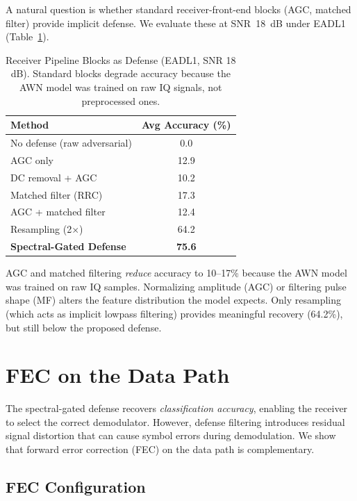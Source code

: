 \documentclass[letterpaper,twocolumn,10pt]{article}
\begin{document}
A natural question is whether standard receiver-front-end blocks
(AGC, matched filter) provide implicit defense. We evaluate these
at SNR~18~dB under EADL1 (Table~\ref{tab:rxpipe}).

\begin{table}[t]
\caption{Receiver Pipeline Blocks as Defense (EADL1, SNR 18 dB).
  Standard blocks degrade accuracy because the AWN model was trained
  on raw IQ signals, not preprocessed ones.}
\label{tab:rxpipe}
\centering
\small
\begin{tabular}{lc}
\toprule
Method & Avg Accuracy (\%) \\
\midrule
No defense (raw adversarial) & 0.0 \\
AGC only & 12.9 \\
DC removal + AGC & 10.2 \\
Matched filter (RRC) & 17.3 \\
AGC + matched filter & 12.4 \\
Resampling (2$\times$) & 64.2 \\
\midrule
\textbf{Spectral-Gated Defense} & \textbf{75.6} \\
\bottomrule
\end{tabular}
\end{table}

AGC and matched filtering \emph{reduce} accuracy to 10--17\%
because the AWN model was trained on raw IQ samples. Normalizing
amplitude (AGC) or filtering pulse shape (MF) alters the feature
distribution the model expects. Only resampling (which acts as
implicit lowpass filtering) provides meaningful recovery (64.2\%),
but still below the proposed defense.

\section{FEC on the Data Path}
\label{sec:fec}

The spectral-gated defense recovers \emph{classification accuracy},
enabling the receiver to select the correct demodulator. However,
defense filtering introduces residual signal distortion that can
cause symbol errors during demodulation. We show that forward error
correction (FEC) on the data path is complementary.

\subsection{FEC Configuration}
\end{document}
